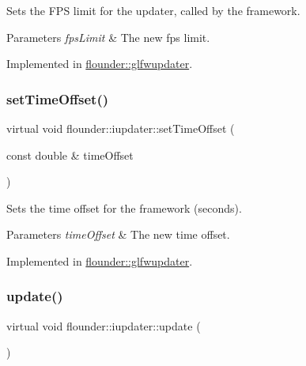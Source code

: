 Sets the F\+PS limit for the updater, called by the framework. 


\begin{DoxyParams}{Parameters}
{\em fps\+Limit} & The new fps limit. \\
\hline
\end{DoxyParams}


Implemented in \hyperlink{classflounder_1_1glfwupdater_a8beaa82a7604b9ae11baf3f822e86113}{flounder\+::glfwupdater}.

\mbox{\label{classflounder_1_1iupdater_aa6aa143e40a5a39bcd53753798438ea1}} 
\subsubsection{\texorpdfstring{set\+Time\+Offset()}{setTimeOffset()}}
{\footnotesize\ttfamily virtual void flounder\+::iupdater\+::set\+Time\+Offset (\begin{DoxyParamCaption}\item[{const double \&}]{time\+Offset }\end{DoxyParamCaption})\hspace{0.3cm}{\ttfamily [pure virtual]}}



Sets the time offset for the framework (seconds). 


\begin{DoxyParams}{Parameters}
{\em time\+Offset} & The new time offset. \\
\hline
\end{DoxyParams}


Implemented in \hyperlink{classflounder_1_1glfwupdater_a7dc4371863e39a3a7870e4a2ac539fed}{flounder\+::glfwupdater}.

\mbox{\label{classflounder_1_1iupdater_a9f9102652e1ec25f7e9fc9b1cd57a041}} 
\subsubsection{\texorpdfstring{update()}{update()}}
{\footnotesize\ttfamily virtual void flounder\+::iupdater\+::update (\begin{DoxyParamCaption}{ }\end{DoxyParamCaption})\hspace{0.3cm}{\ttfamily [pure virtual]}}



